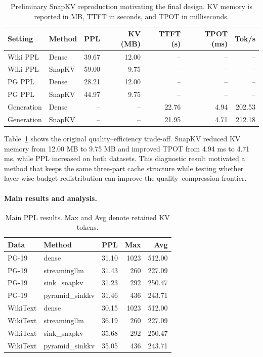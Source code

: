\documentclass{article}
\begin{document}
\begin{table}[t]
  \centering
  \scriptsize
  \caption{Preliminary SnapKV reproduction motivating the final design. KV memory
  is reported in MB, TTFT in seconds, and TPOT in milliseconds.}
  \label{tab:baseline-repro}
  \setlength{\tabcolsep}{3.3pt}
  \begin{tabular}{llrrrrr}
    \toprule
    Setting & Method & PPL & KV (MB) & TTFT (s) & TPOT (ms) & Tok/s \\
    \midrule
    Wiki PPL & Dense & 39.67 & 12.00 & -- & -- & -- \\
    Wiki PPL & SnapKV & 59.00 & 9.75 & -- & -- & -- \\
    PG PPL & Dense & 28.21 & 12.00 & -- & -- & -- \\
    PG PPL & SnapKV & 44.97 & 9.75 & -- & -- & -- \\
    Generation & Dense & -- & -- & 22.76 & 4.94 & 202.53 \\
    Generation & SnapKV & -- & -- & 21.95 & 4.71 & 212.18 \\
    \bottomrule
  \end{tabular}
\end{table}

Table~\ref{tab:baseline-repro} shows the original quality--efficiency trade-off.
SnapKV reduced KV memory from 12.00 MB to 9.75 MB and improved TPOT from 4.94 ms
to 4.71 ms, while PPL increased on both datasets. This diagnostic
result motivated a method that keeps the same three-part cache structure while
testing whether layer-wise budget redistribution can improve the
quality--compression frontier.

\paragraph{Main results and analysis.}

\begin{table}[t]
  \centering
  \small
  \caption{Main PPL results. Max and Avg denote retained KV tokens.}
  \label{tab:main}
  \begin{tabular}{llrrr}
    \toprule
    Data & Method & PPL & Max & Avg \\
    \midrule
    PG-19 & dense & 31.10 & 1023 & 512.00 \\
    PG-19 & streamingllm & 31.43 & 260 & 227.09 \\
    PG-19 & sink\_snapkv & 31.23 & 292 & 250.47 \\
    PG-19 & pyramid\_sinkkv & 31.46 & 436 & 243.71 \\
    \midrule
    WikiText & dense & 30.15 & 1023 & 512.00 \\
    WikiText & streamingllm & 36.19 & 260 & 227.09 \\
    WikiText & sink\_snapkv & 35.68 & 292 & 250.47 \\
    WikiText & pyramid\_sinkkv & 35.05 & 436 & 243.71 \\
    \bottomrule
  \end{tabular}
\end{table}
\end{document}
